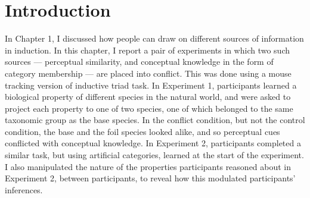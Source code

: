 
\section{Introduction}

In Chapter 1, I discussed how people can
draw on different sources of information in induction.
In this chapter, I report a pair of experiments in which
two such sources --- perceptual similarity,
and conceptual knowledge in the form of category membership ---
are placed into conflict.
This was done using a mouse tracking version of
 inductive triad task.
In Experiment 1, participants learned a biological property of
different species in the natural world, and were asked to
project each property to one of two species,
one of which belonged to the same taxonomic group as the base species.
In the conflict condition, but not the control condition,
the base and the foil species looked alike,
and so perceptual cues conflicted with conceptual knowledge.
In Experiment 2, participants completed a similar task,
but using artificial categories, learned at the start of the experiment.
I also manipulated the nature of the properties
participants reasoned about in Experiment 2, between participants,
to reveal how this modulated participants' inferences.

